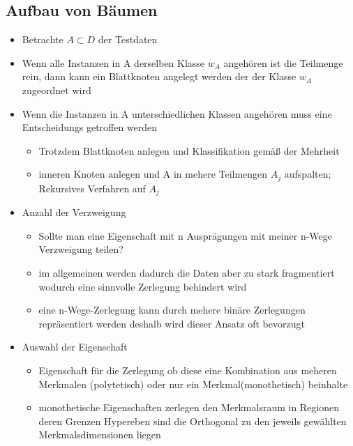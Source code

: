 \documentclass{article} %
\begin{document}
	\subsection{Aufbau von Bäumen}
	\begin{itemize}
		\item Betrachte $A \subset D$ der Testdaten
		\item Wenn alle Instanzen in A derselben Klasse $w_A$ angehören ist die Teilmenge rein, dann kann ein Blattknoten angelegt werden der der Klasse $w_A$ zugeordnet wird
		\item Wenn die Instanzen in A unterschiedlichen Klassen angehören muss eine Entscheidungs getroffen werden
		\begin{itemize}
			\item Trotzdem Blattknoten anlegen und Klassifikation gemäß der Mehrheit
			\item inneren Knoten anlegen und A in mehere Teilmengen $A_j$ aufspalten; Rekursives Verfahren auf $A_j$
		\end{itemize}
		\item Anzahl der Verzweigung
		\begin{itemize}
			\item Sollte man eine Eigenschaft mit n Ausprägungen mit meiner n-Wege Verzweigung teilen?
			\item im allgemeinen werden dadurch die Daten aber zu stark fragmentiert wodurch eine sinnvolle Zerlegung behindert wird
			\item eine n-Wege-Zerlegung kann durch mehere binäre Zerlegungen repräsentiert werden deshalb wird dieser Ansatz oft bevorzugt
		\end{itemize}
		\item Auswahl der Eigenschaft
		\begin{itemize}
			\item Eigenschaft für die Zerlegung ob diese eine Kombination aus meheren Merkmalen (polytetisch) oder nur ein Merkmal(monothetisch) beinhalte
			\item monothetische Eigenschaften zerlegen den Merkmalsraum in Regionen deren Grenzen Hypereben sind die Orthogonal zu den jeweils gewählten Merkmalsdimensionen liegen
		\end{itemize}
	\end{itemize}
\end{document}
